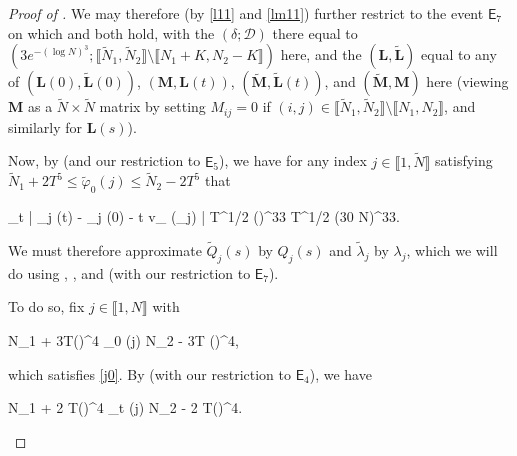 \documentclass{amsart}
\numberwithin{equation}{section}
\DeclareMathOperator{\eff}{eff}
\theoremstyle{remark}
\theoremstyle{definition}
\begin{document}
\begin{proof}[Proof of ]
		\noindent We may therefore (by \eqref{l11} and \eqref{lm11}) further restrict to the event $\mathsf{E}_7$ on which  and  both hold, with the $(\delta; \mathcal{D})$ there equal to $(3e^{-(\log N)^3}; \llbracket \tilde{N}_1, \tilde{N}_2 \rrbracket \setminus \llbracket N_1+K, N_2-K \rrbracket)$ here, and the $(\bm{L}, \tilde{\bm{L}})$ equal to any of $(\bm{L}(0), \tilde{\bm{L}}(0))$, $(\bm{M},\bm{L}(t))$, $(\tilde{\bm{M}},\tilde{\bm{L}}(t))$, and $(\tilde{\bm{M}},\bm{M})$ here (viewing $\bm{M}$ as a $\tilde{N} \times \tilde{N}$ matrix by setting $M_{ij} = 0$ if $(i,j) \in \llbracket \tilde{N}_1, \tilde{N}_2 \rrbracket \setminus \llbracket N_1, N_2 \rrbracket$, and similarly for $\bm{L}(s)$). 
		
		Now, by  (and our restriction to $\mathsf{E}_5$), we have for any index $j \in \llbracket 1, \tilde{N} \rrbracket$ satisfying $\tilde{N}_1 + 2T^5 \le \tilde{\varphi}_0 (j) \le \tilde{N}_2 - 2 T^5$ that 
		\begin{flalign}
			\label{q2j0} 
			\displaystyle\sup_{t \in [0,T]} \big| _j (t) - _j (0) - t v_{\eff} (\tilde{\lambda}_j) \big| \le T^{1/2} (\log {})^{33} \le T^{1/2} \cdot (30 \log N)^{33}.
		\end{flalign}
		
		\noindent We must therefore approximate $\tilde{Q}_j (s)$ by $Q_j (s)$ and $\tilde{\lambda}_j$ by $\lambda_j$, which we will do using , , and  (with our restriction to $\mathsf{E}_7$). 
		  
		To do so, fix $j \in \llbracket 1, N \rrbracket$ with 
		\begin{flalign}
			\label{0j}  
			N_1 + 3T(\log {})^4 \le \varphi_0 (j) \le N_2 - 3T (\log \tilde{N})^4,
		\end{flalign} 
		
		\noindent which satisfies \eqref{j0}. By  (with our restriction to $\mathsf{E}_4$), we have 
		\begin{flalign}
			\label{0j1} 
			N_1 + 2 T(\log {})^4 \le \varphi_t (j) \le N_2 - 2 T(\log \tilde{N})^4.
		\end{flalign} 
		

\end{proof}
\end{document}
